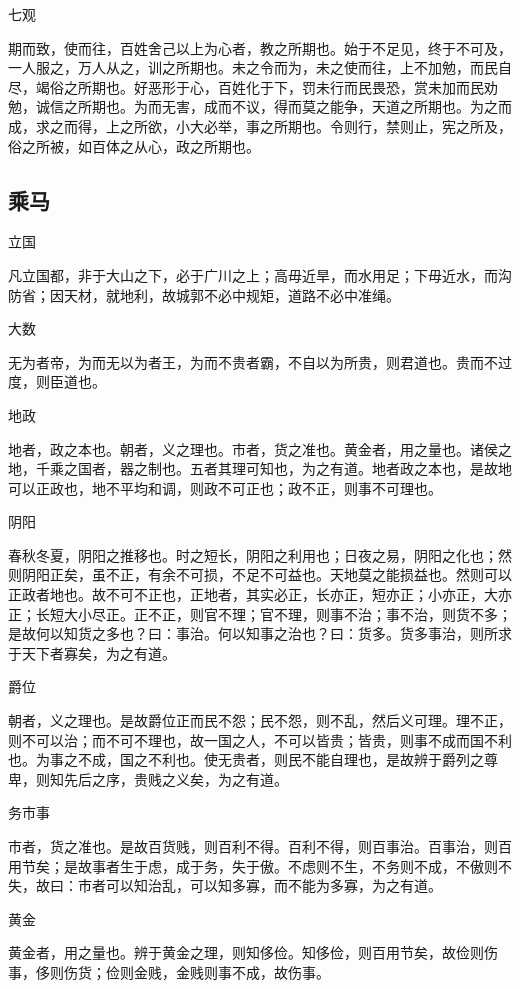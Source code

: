 \documentclass[]{article}
\begin{document}
七观

期而致，使而往，百姓舍己以上为心者，教之所期也。始于不足见，终于不可及，一人服之，万人从之，训之所期也。未之令而为，未之使而往，上不加勉，而民自尽，竭俗之所期也。好恶形于心，百姓化于下，罚未行而民畏恐，赏未加而民劝勉，诚信之所期也。为而无害，成而不议，得而莫之能争，天道之所期也。为之而成，求之而得，上之所欲，小大必举，事之所期也。令则行，禁则止，宪之所及，俗之所被，如百体之从心，政之所期也。

\hypertarget{header-n70}{%
\subsection{乘马 }\label{header-n70}}

立国

凡立国都，非于大山之下，必于广川之上；高毋近旱，而水用足；下毋近水，而沟防省；因天材，就地利，故城郭不必中规矩，道路不必中准绳。

大数

无为者帝，为而无以为者王，为而不贵者霸，不自以为所贵，则君道也。贵而不过度，则臣道也。

地政

地者，政之本也。朝者，义之理也。市者，货之准也。黄金者，用之量也。诸侯之地，千乘之国者，器之制也。五者其理可知也，为之有道。地者政之本也，是故地可以正政也，地不平均和调，则政不可正也；政不正，则事不可理也。

阴阳

春秋冬夏，阴阳之推移也。时之短长，阴阳之利用也；日夜之易，阴阳之化也；然则阴阳正矣，虽不正，有余不可损，不足不可益也。天地莫之能损益也。然则可以正政者地也。故不可不正也，正地者，其实必正，长亦正，短亦正；小亦正，大亦正；长短大小尽正。正不正，则官不理；官不理，则事不治；事不治，则货不多；是故何以知货之多也？曰：事治。何以知事之治也？曰：货多。货多事治，则所求于天下者寡矣，为之有道。

爵位

朝者，义之理也。是故爵位正而民不怨；民不怨，则不乱，然后义可理。理不正，则不可以治；而不可不理也，故一国之人，不可以皆贵；皆贵，则事不成而国不利也。为事之不成，国之不利也。使无贵者，则民不能自理也，是故辨于爵列之尊卑，则知先后之序，贵贱之义矣，为之有道。

务市事

市者，货之准也。是故百货贱，则百利不得。百利不得，则百事治。百事治，则百用节矣；是故事者生于虑，成于务，失于傲。不虑则不生，不务则不成，不傲则不失，故曰：市者可以知治乱，可以知多寡，而不能为多寡，为之有道。

黄金

黄金者，用之量也。辨于黄金之理，则知侈俭。知侈俭，则百用节矣，故俭则伤事，侈则伤货；俭则金贱，金贱则事不成，故伤事。
\end{document}
